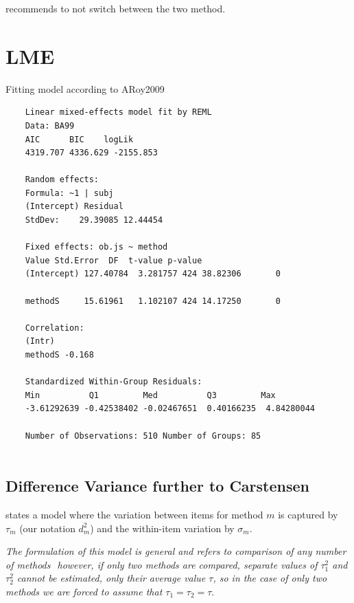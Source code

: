 \documentclass[12pt, a4paper]{report}
\theoremstyle{plain}
\theoremstyle{definition}
\theoremstyle{remark}
\begin{document}
	
	\citet{haber}
	
	\citet{ARoy2009} recommends to not switch between the two method.
	
	\section{LME}
	
	Fitting model according to ARoy2009
	
	\newpage
	\begin{verbatim}
	Linear mixed-effects model fit by REML
	Data: BA99
	AIC      BIC    logLik
	4319.707 4336.629 -2155.853
	
	Random effects:
	Formula: ~1 | subj
	(Intercept) Residual
	StdDev:    29.39085 12.44454
	
	Fixed effects: ob.js ~ method
	Value Std.Error  DF  t-value p-value
	(Intercept) 127.40784  3.281757 424 38.82306       0
	
	methodS     15.61961   1.102107 424 14.17250       0
	
	Correlation:
	(Intr)
	methodS -0.168
	
	Standardized Within-Group Residuals:
	Min          Q1         Med          Q3         Max
	-3.61292639 -0.42538402 -0.02467651  0.40166235  4.84280044
	
	Number of Observations: 510 Number of Groups: 85
	
	\end{verbatim}
	
	\newpage
	
	
	
	
	
	\newpage
	\subsection{Difference Variance further to Carstensen}
	
	\citet{BXC2008} states a model where the variation between items
	for method $m$ is captured by $\tau_m$ (our notation $d^2_m$) and the within-item
	variation by $\sigma_m$.
	
	\emph{The formulation of this model is general and refers to comparison
		of any number of methods  however, if only two methods are
		compared, separate values of $\tau^2_1$ and $\tau^2_2$ cannot be
		estimated, only their average value $\tau$, so in the case of only
		two methods we are forced to assume that $\tau_1 = \tau_2 = \tau$}\citep{BXC2008}.
	
\end{document}
